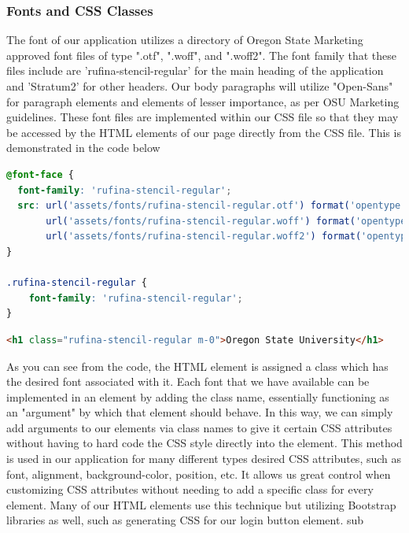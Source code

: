 \documentclass[letterpaper,10pt,serif,draftclsnofoot,onecolumn,compsoc,titlepage]{IEEEtran}
\begin{document}
	\subsubsection{Fonts and CSS Classes}
	The font of our application utilizes a directory of Oregon State Marketing approved font files of type ".otf", ".woff", and ".woff2". The font family that 
	these files include are 'rufina-stencil-regular' for the main heading of the application and 'Stratum2' for other headers. Our body paragraphs will utilize "Open-Sans" 
	for paragraph elements and elements of lesser importance, as per OSU Marketing guidelines. These font files 
	are implemented within our CSS file so that they may be accessed by the HTML elements of our page directly from the CSS file. This is demonstrated in the code below
	
\begin{lstlisting}[caption={CSS Implementation} language=CSS]
@font-face {
  font-family: 'rufina-stencil-regular';
  src: url('assets/fonts/rufina-stencil-regular.otf') format('opentype'),
       url('assets/fonts/rufina-stencil-regular.woff') format('opentype'),
       url('assets/fonts/rufina-stencil-regular.woff2') format('opentype');
}

.rufina-stencil-regular {
	font-family: 'rufina-stencil-regular';
}
\end{lstlisting}
\begin{lstlisting}[caption={HTML Implementation} language=HTML]
<h1 class="rufina-stencil-regular m-0">Oregon State University</h1>
\end{lstlisting}

	As you can see from the code, the HTML element is assigned a class which has the desired font associated with it. Each font that we have available can be 
	implemented in an element by adding the class name, essentially functioning as an "argument" by which that element should behave. In this way, we can simply
	add arguments to our elements via class names to give it certain CSS attributes without having to hard code the CSS style directly into the element. This method is used in our application for many
	different types desired CSS attributes, such as font, alignment, background-color, position, etc. It allows us great control when customizing CSS attributes without 
	needing to add a specific class for every element. Many of our HTML elements use this technique but utilizing Bootstrap libraries as well, such as generating CSS for 
	our login button element. 
	sub
	
\end{document}
